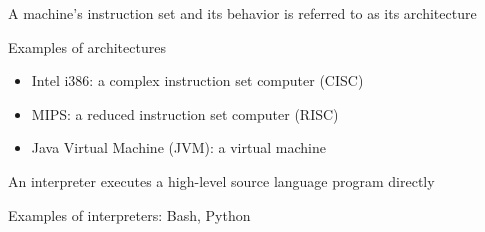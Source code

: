 \documentclass[8pt,a4paper,compress]{beamer}
\begin{document}
\begin{frame}[fragile]
\pause\transdissolve

A machine's instruction set and its behavior is referred to as its architecture

\pause\transdissolve\bigskip

Examples of architectures
\begin{itemize}
\pause\transdissolve
\item Intel i386: a complex instruction set computer (CISC)

\pause\transdissolve
\item MIPS: a reduced instruction set computer (RISC)

\pause\transdissolve
\item Java Virtual Machine (JVM): a virtual machine
\end{itemize}
\end{frame}

\begin{frame}[fragile]
\pause\transdissolve

An interpreter executes a high-level source language program directly

\begin{center}
\end{center}

\pause\transdissolve\bigskip

Examples of interpreters: Bash, Python
\end{frame}
\end{document}
